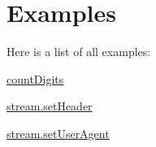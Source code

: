 \section{Examples}
Here is a list of all examples\+:\begin{DoxyCompactItemize}
\item 
\mbox{\hyperlink{countDigits-example}{count\+Digits}}
\item 
\mbox{\hyperlink{stream_8setHeader-example}{stream.\+set\+Header}}
\item 
\mbox{\hyperlink{stream_8setUserAgent-example}{stream.\+set\+User\+Agent}}
\end{DoxyCompactItemize}
